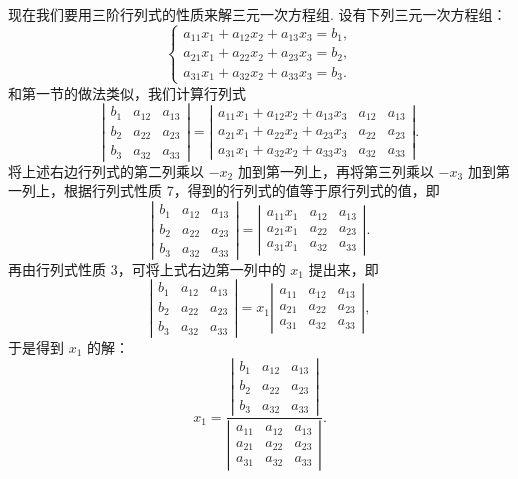 \documentclass[UTF8, 12pt, fontset=fandol, oneside]{ctexart}
\begin{document}
现在我们要用三阶行列式的性质来解三元一次方程组. 设有下列三元一次方程组：
\begin{equation}
\left\{
\begin{array}{l}
a_{11}x_1+a_{12}x_2+a_{13}x_3=b_1,\\
a_{21}x_1+a_{22}x_2+a_{23}x_3=b_2,\\
a_{31}x_1+a_{32}x_2+a_{33}x_3=b_3.
\end{array}
\right.
\tag{1.2.2}
\end{equation}
和第一节的做法类似，我们计算行列式
\[
\left|\begin{array}{ccc}
b_1 & a_{12} & a_{13}\\
b_2 & a_{22} & a_{23}\\
b_3 & a_{32} & a_{33}
\end{array}\right|
=
\left|\begin{array}{ccc}
a_{11}x_1+a_{12}x_2+a_{13}x_3 & a_{12} & a_{13}\\
a_{21}x_1+a_{22}x_2+a_{23}x_3 & a_{22} & a_{23}\\
a_{31}x_1+a_{32}x_2+a_{33}x_3 & a_{32} & a_{33}
\end{array}\right|.
\]
将上述右边行列式的第二列乘以 $-x_2$ 加到第一列上，再将第三列乘以 $-x_3$ 加到第一列上，根据行列式性质 7，得到的行列式的值等于原行列式的值，即
\[
\left|\begin{array}{ccc}
b_1 & a_{12} & a_{13}\\
b_2 & a_{22} & a_{23}\\
b_3 & a_{32} & a_{33}
\end{array}\right|
=
\left|\begin{array}{ccc}
a_{11}x_1 & a_{12} & a_{13}\\
a_{21}x_1 & a_{22} & a_{23}\\
a_{31}x_1 & a_{32} & a_{33}
\end{array}\right|.
\]
再由行列式性质 3，可将上式右边第一列中的 $x_1$ 提出来，即
\[
\left|\begin{array}{ccc}
b_1 & a_{12} & a_{13}\\
b_2 & a_{22} & a_{23}\\
b_3 & a_{32} & a_{33}
\end{array}\right|
=x_1
\left|\begin{array}{ccc}
a_{11} & a_{12} & a_{13}\\
a_{21} & a_{22} & a_{23}\\
a_{31} & a_{32} & a_{33}
\end{array}\right|,
\]
于是得到 $x_1$ 的解：
\[
x_1=
\frac{
\left|\begin{array}{ccc}
b_1 & a_{12} & a_{13}\\
b_2 & a_{22} & a_{23}\\
b_3 & a_{32} & a_{33}
\end{array}\right|}
{\left|\begin{array}{ccc}
a_{11} & a_{12} & a_{13}\\
a_{21} & a_{22} & a_{23}\\
a_{31} & a_{32} & a_{33}
\end{array}\right|}.
\]
\end{document}
